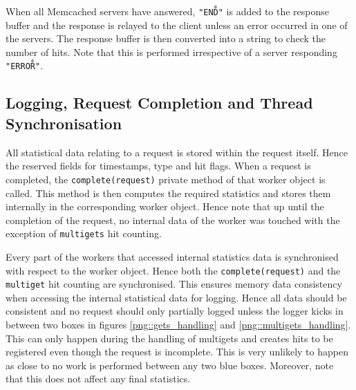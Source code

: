 \documentclass[11pt,a4paper]{article}
\begin{document}
When all Memcached servers have answered, \texttt{"END\r\n"} is added to the response buffer and the response is relayed to the client unless an error occurred in one of the servers. The response buffer is then converted into a string to check the number of hits. Note that this is performed irrespective of a server responding \texttt{"ERROR\r\n"}.


\subsection{Logging, Request Completion and Thread Synchronisation}
All statistical data relating to a request is stored within the request itself. Hence the reserved fields for timestamps, type and hit flags. When a request is completed, the \texttt{complete(request)} private method of that worker object is called. This method is then computes the required statistics and stores them internally in the corresponding worker object. Hence note that up until the completion of the request, no internal data of the worker was touched with the exception of \texttt{multigets} hit counting.

Every part of the workers that accessed internal statistics data is synchronised with respect to the worker object. Hence both the \texttt{complete(request)} and the \texttt{multiget} hit counting are synchronised. This ensures memory data consistency when accessing the internal statistical data for logging. Hence all data should be consistent and no request should only partially logged unless the logger kicks in between two boxes in figures \ref{png::gets_handling} and \ref{png::multigets_handling}. This can only happen during the handling of multigets and creates hits to be registered even though the request is incomplete. This is very unlikely to happen as close to no work is performed between any two blue boxes. Moreover, note that this does not affect any final statistics.
\end{document}
